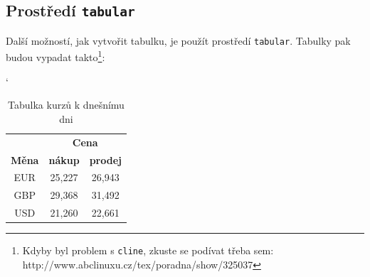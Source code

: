 \documentclass[11pt, a4paper]{article}
\begin{document}
\subsection{Prostředí \texttt{tabular}}
Další možností, jak vytvořit tabulku, je použít prostředí \verb|tabular|. Tabulky pak 
budou vypadat takto\footnote{\indent Kdyby byl problem s \texttt{cline}, zkuste se podívat třeba sem: 
http://www.abclinuxu.cz/tex/poradna/show/325037}:

\catcode`
\begin{table}[h]
    \centering
\begin{tabular}{|c|c|c|}
    \hline
     & \multicolumn{2}{|c|}{\bfseries Cena}  \\
     \cline{2-3}
    
    \textbf{Měna} & \textbf{nákup} & \textbf{prodej} \\
    \hline
    EUR & 25,227 & 26,943 \\
    GBP & 29,368 & 31,492 \\
    USD & 21,260 & 22,661 \\
    \hline
    
\end{tabular}
\caption{Tabulka kurzů k dnešnímu dni}
\label{tab:my_label}
\end{table}
\end{document}
